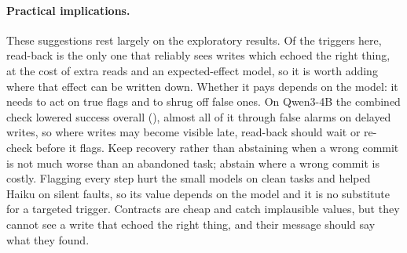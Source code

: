 \paragraph{Practical implications.} These suggestions rest largely on the exploratory results. Of the
triggers here, read-back is the only one that reliably sees writes which echoed the right thing, at the
cost of extra reads and an expected-effect model, so it is worth adding where that effect can be
written down. Whether it pays depends on the model: it needs to act on true flags and to shrug off
false ones. On Qwen3-4B the combined check lowered success overall (\RExpQwenFourPThreeDiff{}), almost
all of it through false alarms on delayed writes, so where writes may become visible late, read-back
should wait or re-check before it flags. Keep recovery rather than abstaining when a wrong commit is
not much worse than an abandoned task; abstain where a wrong commit is costly. Flagging every step
hurt the small models on clean tasks and helped Haiku on silent faults, so its value depends on the
model and it is no substitute for a targeted trigger. Contracts are
cheap and catch implausible values, but they cannot see a write that echoed the right thing, and their
message should say what they found.

